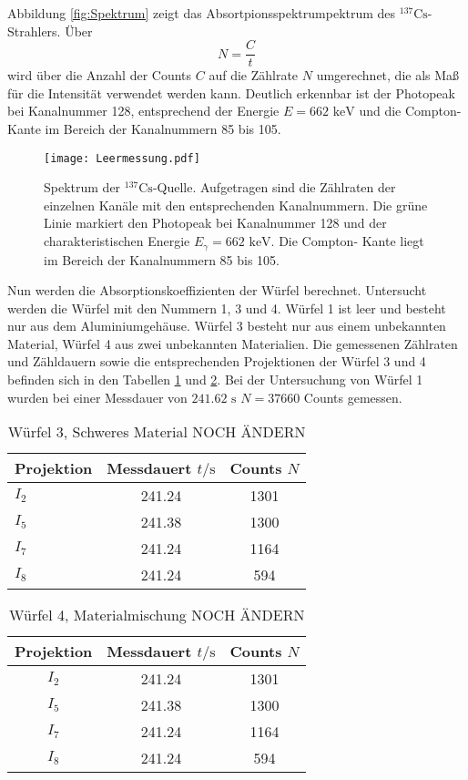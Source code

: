 Abbildung \ref{fig:Spektrum} zeigt das Absortpionsspektrumpektrum des ${}^{137}\text{Cs}$-Strahlers.
Über 
\begin{equation*}
    N = \frac{C}{t}
\end{equation*}
wird über die Anzahl der Counts $C$ auf die Zählrate $N$ umgerechnet, die als Maß für die Intensität
verwendet werden kann.
Deutlich erkennbar ist der Photopeak bei Kanalnummer 128, entsprechend der Energie $E= 662 \text{ keV}$ 
und die Compton-Kante im Bereich der Kanalnummern 85 bis 105. 
\begin{figure}
    \centering
    \texttt{[image: Leermessung.pdf]}
    \caption{Spektrum der ${}^{137}\text{Cs}$-Quelle. Aufgetragen sind die Zählraten der einzelnen
    Kanäle mit den entsprechenden Kanalnummern. Die grüne Linie markiert den Photopeak bei  
    Kanalnummer 128 und der charakteristischen Energie $E_\gamma = 662 \text{ keV}$. Die Compton-
    Kante liegt im Bereich der Kanalnummern 85 bis 105.}
    \label{fig:spektrum}
\end{figure}
Nun werden die Absorptionskoeffizienten der Würfel berechnet. Untersucht
werden die Würfel mit den Nummern 1, 3 und 4. Würfel 1 ist leer und besteht nur aus dem Aluminiumgehäuse.
Würfel 3 besteht nur aus einem unbekannten Material, Würfel 4 aus zwei unbekannten Materialien. 
Die gemessenen Zählraten und Zähldauern sowie die entsprechenden Projektionen der Würfel 3 und 4 
befinden sich in den Tabellen \ref{tab:W3} und \ref{tab:W4}. 
Bei der Untersuchung von Würfel 1 wurden bei einer Messdauer von $241.62 \text{ s}$ $N = 37660$ Counts
gemessen.
\FloatBarrier
\begin{table}[h]
    \centering
    \caption{Würfel 3, Schweres Material NOCH ÄNDERN}
    \label{tab:W3}
    \begin{tabular}{l c c}
        \toprule
        {Projektion} & {Messdauert $t/\si{\s}$} & {Counts $N$}\\
        \midrule
        $I_2$ & 241.24 & 1301 \\
        $I_5$ & 241.38 & 1300 \\
        $I_7$ & 241.24 & 1164 \\
        $I_8$ & 241.24 & 594 \\
        \bottomrule
    \end{tabular}
\end{table}
\FloatBarrier
\noindent
\FloatBarrier
\begin{table}[h]
    \centering
    \caption{Würfel 4, Materialmischung NOCH ÄNDERN}
    \label{tab:W4}
    \begin{tabular}{c c c}
        \toprule
        {Projektion} & {Messdauert $t/\si{\s}$} & {Counts $N$}\\
        \midrule
        $I_2$ & 241.24 & 1301 \\
        $I_5$ & 241.38 & 1300 \\
        $I_7$ & 241.24 & 1164 \\
        $I_8$ & 241.24 & 594 \\
        \bottomrule
    \end{tabular}
\end{table}
\FloatBarrier
\noindent